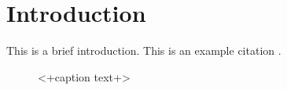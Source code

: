 \documentclass[../../main.tex]{subfiles} %
\begin{document}
\section{Introduction}
This is a brief introduction. This is an example citation \cite{example_ref}.

\begin{figure}[ht]
	\centering
	
	\caption{<+caption text+>}
	\label{fig:<+label+>}
\end{figure}
\end{document}
